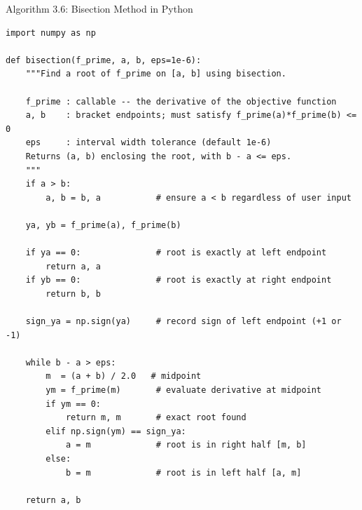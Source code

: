\documentclass[aspectratio=169,10pt]{beamer}
\begin{document}
\begin{frame}[fragile]{Algorithm 3.6: Bisection Method in Python}
\begin{lstlisting}[style=pycode, caption={Python: Bisection method applied to f\_prime to find a root on [a,b]}]
import numpy as np

def bisection(f_prime, a, b, eps=1e-6):
    """Find a root of f_prime on [a, b] using bisection.

    f_prime : callable -- the derivative of the objective function
    a, b    : bracket endpoints; must satisfy f_prime(a)*f_prime(b) <= 0
    eps     : interval width tolerance (default 1e-6)
    Returns (a, b) enclosing the root, with b - a <= eps.
    """
    if a > b:
        a, b = b, a           # ensure a < b regardless of user input

    ya, yb = f_prime(a), f_prime(b)

    if ya == 0:               # root is exactly at left endpoint
        return a, a
    if yb == 0:               # root is exactly at right endpoint
        return b, b

    sign_ya = np.sign(ya)     # record sign of left endpoint (+1 or -1)

    while b - a > eps:
        m  = (a + b) / 2.0   # midpoint
        ym = f_prime(m)       # evaluate derivative at midpoint
        if ym == 0:
            return m, m       # exact root found
        elif np.sign(ym) == sign_ya:
            a = m             # root is in right half [m, b]
        else:
            b = m             # root is in left half [a, m]

    return a, b
\end{lstlisting}
\end{frame}
\end{document}

